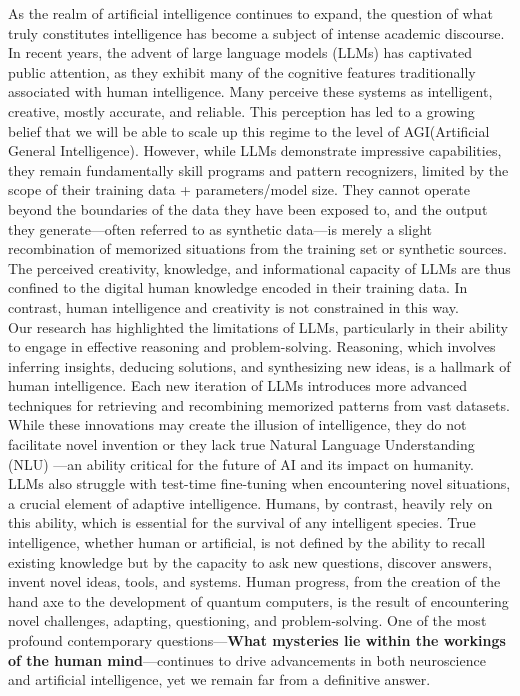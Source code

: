 \documentclass[11pt]{scrartcl}
\begin{document}
As the realm of artificial intelligence continues to expand, the question of what truly constitutes intelligence has become a subject of intense academic discourse. In recent years, the advent of large language models (LLMs) has captivated public attention, as they exhibit many of the cognitive features traditionally associated with human intelligence. Many perceive these systems as intelligent, creative, mostly accurate, and reliable. This perception has led to a growing belief that we will be able to scale up this regime to the level of AGI(Artificial General Intelligence). However, while LLMs demonstrate impressive capabilities, they remain fundamentally skill programs and pattern recognizers, limited by the scope of their training data + parameters/model size. They cannot operate beyond the boundaries of the data they have been exposed to, and the output they generate—often referred to as synthetic data—is merely a slight recombination of memorized situations from the training set or synthetic sources. The perceived creativity, knowledge, and informational capacity of LLMs are thus confined to the digital human knowledge encoded in their training data. In contrast, human intelligence and creativity is not constrained in this way. \\

Our research has highlighted the limitations of LLMs, particularly in their ability to engage in effective reasoning and problem-solving. Reasoning, which involves inferring insights, deducing solutions, and synthesizing new ideas, is a hallmark of human intelligence. Each new iteration of LLMs introduces more advanced techniques for retrieving and recombining memorized patterns from vast datasets. While these innovations may create the illusion of intelligence, they do not facilitate novel invention or they lack true Natural Language Understanding (NLU) —an ability critical for the future of AI and its impact on humanity. LLMs also struggle with test-time fine-tuning when encountering novel situations, a crucial element of adaptive intelligence. Humans, by contrast, heavily rely on this ability, which is essential for the survival of any intelligent species. True intelligence, whether human or artificial, is not defined by the ability to recall existing knowledge but by the capacity to ask new questions, discover answers, invent novel ideas, tools, and systems. Human progress, from the creation of the hand axe to the development of quantum computers, is the result of encountering novel challenges, adapting, questioning, and problem-solving. One of the most profound contemporary questions—\textbf{What mysteries lie within the workings of the human mind}—continues to drive advancements in both neuroscience and artificial intelligence, yet we remain far from a definitive answer.
\end{document}
